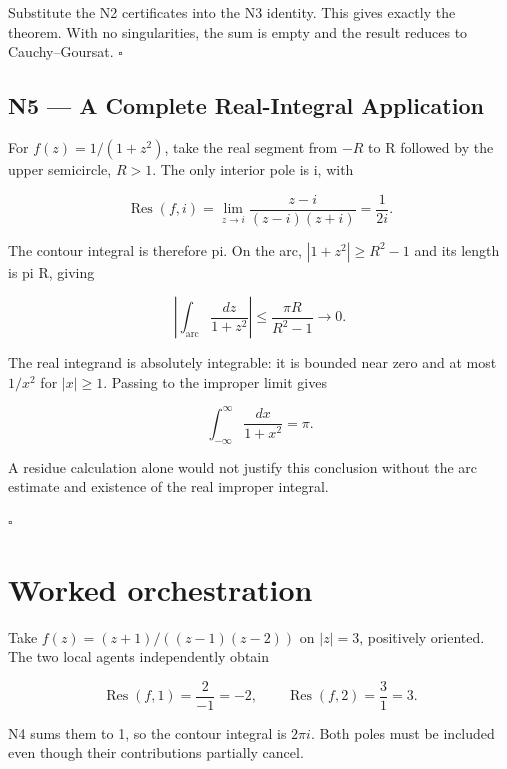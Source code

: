 \documentclass[preprint,12pt,aps,pra,showkeys,amsmath,amssymb,superscriptaddress,floatfix]{revtex4-2}
\theoremstyle{definition}
\theoremstyle{remark}
\begin{document}
Substitute the N2 certificates into the N3 identity. This gives exactly
the theorem. With no singularities, the sum is empty and the result
reduces to Cauchy--Goursat. \(\square\)

\subsection{N5 --- A Complete Real-Integral
Application}\label{n5-a-complete-real-integral-application}

For \(f(z)=1/(1+z^2)\), take the real segment from \(-R\) to R followed
by the upper semicircle, \(R>1\). The only interior pole is i, with

\[\operatorname{Res}(f,i)=\lim_{z\to i}\frac{z-i}{(z-i)(z+i)}=\frac1{2i}.\]

The contour integral is therefore pi. On the arc, \(|1+z^2|\ge R^2-1\)
and its length is pi R, giving

\[\left|\int_{\mathrm{arc}}\frac{dz}{1+z^2}\right|\le\frac{\pi R}{R^2-1}\longrightarrow0.\]

The real integrand is absolutely integrable: it is bounded near zero and
at most \(1/x^2\) for \(|x|\ge 1\). Passing to the improper limit gives

\[\int_{-\infty}^{\infty}\frac{dx}{1+x^2}=\pi.\]

A residue calculation alone would not justify this conclusion without
the arc estimate and existence of the real improper integral.

\hfill$\square$

\section{Worked orchestration}

Take \(f(z)=(z+1)/((z-1)(z-2))\) on \(|z|=3\), positively oriented. The
two local agents independently obtain

\[\operatorname{Res}(f,1)=\frac2{-1}=-2,\qquad\operatorname{Res}(f,2)=\frac3{1}=3.\]

N4 sums them to 1, so the contour integral is \(2\pi i\). Both poles
must be included even though their contributions partially cancel.
\end{document}
